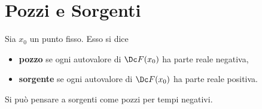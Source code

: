 \newpage
\section{Pozzi e Sorgenti}

\begin{definition}
    Sia $x_0$ un punto fisso. Esso si dice
    \setlength{\leftmargini}{0.5cm}
    \begin{itemize}
        \item \textbf{pozzo} se ogni autovalore di $\Dc F(x_0)$ ha parte reale negativa,
        \item \textbf{sorgente} se ogni autovalore di $\Dc F(x_0)$ ha parte reale positiva.
    \end{itemize}
\end{definition}
    
\begin{remark}
    Si pu\`o pensare a sorgenti come pozzi per tempi negativi.
\end{remark}
    
